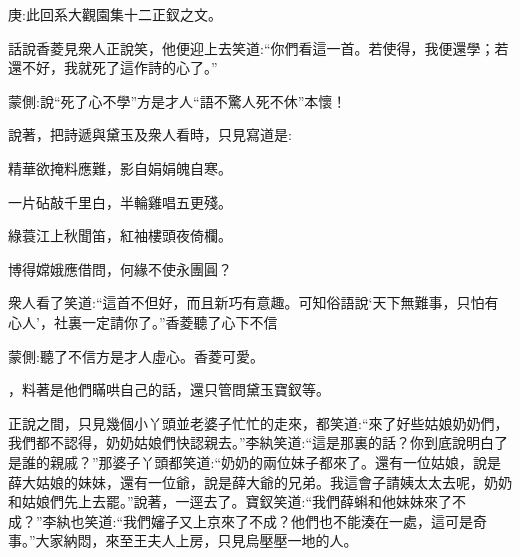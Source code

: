 

\begin{parag}
    \begin{note}庚:此回系大觀園集十二正釵之文。\end{note}
\end{parag}


\begin{parag}
    話說香菱見衆人正說笑，他便迎上去笑道:“你們看這一首。若使得，我便還學；若還不好，我就死了這作詩的心了。”\begin{note}蒙側:說“死了心不學”方是才人“語不驚人死不休”本懷！\end{note}說著，把詩遞與黛玉及衆人看時，只見寫道是:
\end{parag}


\begin{poem}
    \begin{pl}精華欲掩料應難，影自娟娟魄自寒。\end{pl}

    \begin{pl}一片砧敲千里白，半輪雞唱五更殘。\end{pl}

    \begin{pl}綠蓑江上秋聞笛，紅袖樓頭夜倚欄。\end{pl}

    \begin{pl}博得嫦娥應借問，何緣不使永團圓？\end{pl}


\end{poem}


\begin{parag}
    衆人看了笑道:“這首不但好，而且新巧有意趣。可知俗語說‘天下無難事，只怕有心人’，社裏一定請你了。”香菱聽了心下不信\begin{note}蒙側:聽了不信方是才人虛心。香菱可愛。\end{note}，料著是他們瞞哄自己的話，還只管問黛玉寶釵等。
\end{parag}


\begin{parag}
    正說之間，只見幾個小丫頭並老婆子忙忙的走來，都笑道:“來了好些姑娘奶奶們，我們都不認得，奶奶姑娘們快認親去。”李紈笑道:“這是那裏的話？你到底說明白了是誰的親戚？”那婆子丫頭都笑道:“奶奶的兩位妹子都來了。還有一位姑娘，說是薛大姑娘的妹妹，還有一位爺，說是薛大爺的兄弟。我這會子請姨太太去呢，奶奶和姑娘們先上去罷。”說著，一逕去了。寶釵笑道:“我們薛蝌和他妹妹來了不成？”李紈也笑道:“我們嬸子又上京來了不成？他們也不能湊在一處，這可是奇事。”大家納悶，來至王夫人上房，只見烏壓壓一地的人。
\end{parag}


